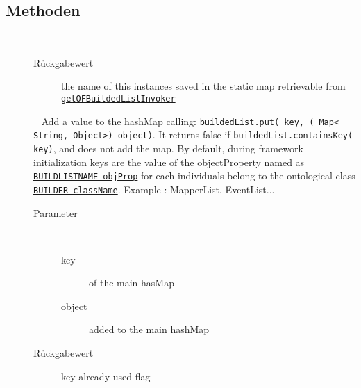 \subsection{Methoden}
\begin{description}
\item[{\label{ontologyFramework.OFRunning.OFInvokingManager.OFBuildedListInvoker.getInstanceName()}}]
~ 
\begin{description}
\item[Rückgabewert] 
the name of this instances saved in the static map retrievable from  \texttt{\hyperlink{ontologyFramework.OFRunning.OFInvokingManager.OFBuildedListInvoker.getOFBuildedListInvoker(java.lang.String)}{getOFBuildedListInvoker}}
\end{description}
\item[{\label{ontologyFramework.OFRunning.OFInvokingManager.OFBuildedListInvoker.addTobuildedList(java.lang.String,java.util.Map<?,?>)}}]
~ Add a value to the hashMap calling:
 \verb!buildedList.put( key, ( Map< String, Object>) object)!.
 It returns false if \verb!buildedList.containsKey( key)!, and does
 not add the map.
 By default, during framework initialization keys are the value of the objectProperty 
 named as \texttt{\hyperlink{ontologyFramework.OFRunning.OFInitialising.OFBuilderCommon.BUILDLISTNAME_objProp}{BUILDLISTNAME_objProp}} for each individuals belong 
 to the ontological class \texttt{\hyperlink{ontologyFramework.OFRunning.OFInitialising.OFInitialiser.BUILDER_className}{BUILDER_className}}. Example : 
 \textquotedbl MapperList\textquotedbl , \textquotedbl EventList\textquotedbl  ...
\begin{description}
\item[Parameter] ~
\begin{description}
\item[key]
of the main hasMap
\item[object]
added to the main hashMap
\end{description}
\item[Rückgabewert] 
key already used flag

\end{description}
\end{description}

